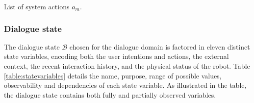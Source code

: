 \begin{table}[p!]
\begin{footnotesize}
\end{footnotesize}
 \caption{List of system actions $a_m$.} 
\label{table:systemdas_exp3}
\end{table}

\subsubsection*{Dialogue state}

The dialogue state $\mathcal{B}$ chosen for the dialogue domain is factored in eleven distinct state variables, encoding both the user intentions and actions, the external context, the recent interaction history, and the physical status of the robot. Table \ref{table:statevariables} details the name, purpose, range of possible values, observability and dependencies of each state variable. As illustrated in the table, the dialogue state contains both fully and partially observed variables. 



